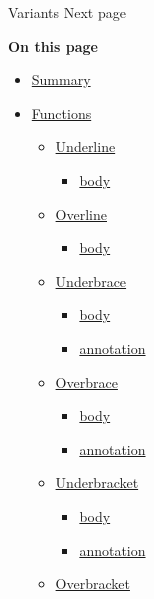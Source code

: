 { Variants } { Next page }

\textbf{On this page}

\begin{itemize}
\tightlist
\item
  \hyperref[summary]{Summary}
\item
  \hyperref[functions]{Functions}

  \begin{itemize}
  \tightlist
  \item
    \hyperref[functions-underline]{Underline}

    \begin{itemize}
    \tightlist
    \item
      \hyperref[functions-underline-body]{body}
    \end{itemize}
  \item
    \hyperref[functions-overline]{Overline}

    \begin{itemize}
    \tightlist
    \item
      \hyperref[functions-overline-body]{body}
    \end{itemize}
  \item
    \hyperref[functions-underbrace]{Underbrace}

    \begin{itemize}
    \tightlist
    \item
      \hyperref[functions-underbrace-body]{body}
    \item
      \hyperref[functions-underbrace-annotation]{annotation}
    \end{itemize}
  \item
    \hyperref[functions-overbrace]{Overbrace}

    \begin{itemize}
    \tightlist
    \item
      \hyperref[functions-overbrace-body]{body}
    \item
      \hyperref[functions-overbrace-annotation]{annotation}
    \end{itemize}
  \item
    \hyperref[functions-underbracket]{Underbracket}

    \begin{itemize}
    \tightlist
    \item
      \hyperref[functions-underbracket-body]{body}
    \item
      \hyperref[functions-underbracket-annotation]{annotation}
    \end{itemize}
  \item
    \hyperref[functions-overbracket]{Overbracket}


\end{itemize}
\end{itemize}
